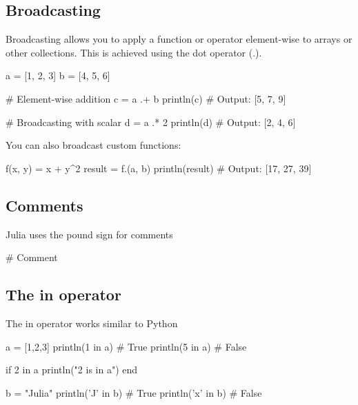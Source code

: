 \documentclass{report}
\begin{document}
    \bigbreak \noindent 
    \subsection{Broadcasting}
    \bigbreak \noindent 
    Broadcasting allows you to apply a function or operator element-wise to arrays or other collections. This is achieved using the dot operator (.).
    \bigbreak \noindent 
    \begin{jlcode}
        a = [1, 2, 3]
        b = [4, 5, 6]

        # Element-wise addition
        c = a .+ b
        println(c)  # Output: [5, 7, 9]

        # Broadcasting with scalar
        d = a .* 2
        println(d)  # Output: [2, 4, 6]
    \end{jlcode}
    \bigbreak \noindent 
    You can also broadcast custom functions:
    \bigbreak \noindent 
    \begin{jlcode}
        f(x, y) = x + y^2
        result = f.(a, b)
        println(result)  # Output: [17, 27, 39]
    \end{jlcode}








    \bigbreak \noindent 
    \subsection{Comments}
    \bigbreak \noindent 
    Julia uses the pound sign for comments
    \bigbreak \noindent 
    \begin{jlcode}
    # Comment
    \end{jlcode}

    \bigbreak \noindent 
    \subsection{The in operator}
    \bigbreak \noindent 
    The in operator works similar to Python
    \bigbreak \noindent 
    \begin{jlcode}
        a = [1,2,3]
        println(1 in a) # True
        println(5 in a) # False

        if 2 in a
            println("2 is in a")
        end

        b = "Julia"
        println('J' in b) # True
        println('x' in b) # False
    \end{jlcode}

    \bigbreak \noindent 
\end{document}
